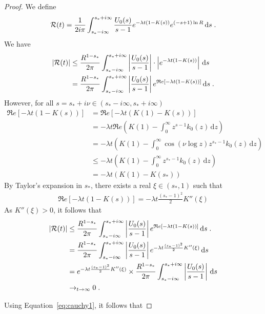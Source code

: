 \documentclass[11pt]{amsart}
\renewcommand{\Re}{\mathfrak{R}e}
\newcommand{\diff}{\,\mathrm{d}}
\begin{document}
\begin{proof}
We define
\begin{align*}
    \Rcal(t) = \frac{1}{2i\pi} \int_{s_*-i\infty}^{s_*+i\infty} \frac{U_0(s)}{s-1} e^{-\lambda t(1 - K(s))} e^{(-s+1)\ln R} \diff s
    \eqfinp
\end{align*}
We have 
\begin{align*}
    |\Rcal(t)| 
    &\leq \frac{R^{1-s_*}}{2\pi} \int_{s_*-i\infty}^{s_*+i\infty} \left|\frac{U_0(s) }{s-1}\right| \cdot \left|e^{-\lambda t(1 - K(s))}\right| \diff s \\
    &= \frac{R^{1-s_*}}{2\pi} \int_{s_*-i\infty}^{s_*+i\infty} \left|\frac{U_0(s) }{s-1}\right| e^{\Re[-\lambda t(1 - K(s))]} \diff s
    \eqfinp
\end{align*}
However, for all $s = s_* + i\nu \in (s_*-i \infty, s_* + i \infty)$
\begin{align*}
    \Re[-\lambda t(1 - K(s))] 
    &= \Re[-\lambda t(K(1) - K(s))] \\
    &= -\lambda t \Re\left( K(1) - \int_0^\infty z^{s-1}k_0(z)\diff z  \right) \\
    &=  -\lambda t\left( K(1) - \int_0^\infty \cos(\nu \log z) z^{s_*-1}k_0(z)\diff z  \right) \\
    &\leq -\lambda t \left( K(1) - \int_0^\infty z^{s_*-1}k_0(z)\diff z  \right) \\
    &= -\lambda t \left( K(1) - K(s_*)  \right)
\end{align*}
By Taylor's expansion in $s_*$, there exists a real $\xi \in (s_*, 1)$ such that 
\begin{align*}
    \Re[-\lambda t(1 - K(s))] = - \lambda t \frac{(s_*-1)^2}{2}  K''(\xi) 
\end{align*}
As $ K''(\xi) > 0$, it follows that 
\begin{align*}
    |\Rcal(t)| 
    &\leq \frac{R^{1-s_*}}{2\pi} \int_{s_*-i\infty}^{s_*+i\infty} \left|\frac{U_0(s) }{s-1}\right| e^{\Re[-\lambda t(1 - K(s))]} \diff s
    \eqfinp \\
    &= \frac{R^{1-s_*}}{2\pi} \int_{s_*-i\infty}^{s_*+i\infty} \left|\frac{U_0(s) }{s-1}\right| e^{- \lambda t \frac{(s_*-1)^2}{2}  K''(\xi) } \diff s \\
    &= e^{- \lambda t \frac{(s_*-1)^2}{2}  K''(\xi)} \times \frac{R^{1-s_*}}{2\pi} \int_{s_*-i\infty}^{s_*+i\infty} \left|\frac{U_0(s) }{s-1}\right| \diff s \\
    &\to_{t \to \infty} 0
    \eqfinp
\end{align*}

Using Equation~\ref{eq:cauchy1}, it follows that 


\end{proof}
\end{document}
